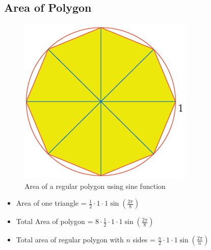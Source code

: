 \subsection{Area of Polygon}
\begin{figure}
    \centering
    \includegraphics[scale=0.3]{pics/28.png}
    \caption{Area of a regular polygon using sine function}
\end{figure}
\begin{itemize}
    \item Area of one triangle = $\frac{1}{2} \cdot 1 \cdot 1 \sin(\frac{2\pi}{8})$
    \item Total Area of polygon = $8 \cdot \frac{1}{2} \cdot 1 \cdot 1 \sin(\frac{2\pi}{8})$
    \item Total area of regular polygon with $n$ sides = $\frac{n}{2} \cdot 1 \cdot 1 \sin(\frac{2\pi}{n})$
\end{itemize}

